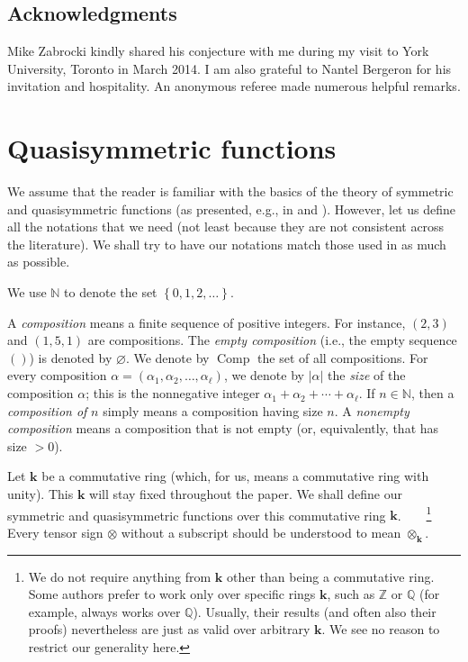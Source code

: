 \documentclass
[numbers=enddot,12pt,final,onecolumn,notitlepage,abstracton]{scrartcl}%
\theoremstyle{definition}
\begin{document}
\subsection{Acknowledgments}

Mike Zabrocki kindly shared his conjecture with me during my visit to York
University, Toronto in March 2014. I am also grateful to Nantel Bergeron for
his invitation and hospitality. An anonymous referee made numerous helpful remarks.

\section{\label{sect.qsym}Quasisymmetric functions}

We assume that the reader is familiar with the basics of the theory of
symmetric and quasisymmetric functions (as presented, e.g., in \cite[Chapters
4 and 6]{HGK} and \cite[Chapters 2 and 5]{Reiner}). However, let us define all
the notations that we need (not least because they are not consistent across
the literature). We shall try to have our notations match those used in
\cite[Section 2]{BBSSZ} as much as possible.

We use $\mathbb{N}$ to denote the set $\left\{  0,1,2,\ldots\right\}  $.

A \textit{composition} means a finite sequence of positive integers. For
instance, $\left(  2,3\right)  $ and $\left(  1,5,1\right)  $ are
compositions. The \textit{empty composition} (i.e., the empty sequence
$\left(  {}\right)  $) is denoted by $\varnothing$. We denote by
$\operatorname*{Comp}$ the set of all compositions. For every composition
$\alpha=\left(  \alpha_{1},\alpha_{2},\ldots,\alpha_{\ell}\right)  $, we
denote by $\left\vert \alpha\right\vert $ the \textit{size} of the composition
$\alpha$; this is the nonnegative integer $\alpha_{1}+\alpha_{2}+\cdots
+\alpha_{\ell}$. If $n\in\mathbb{N}$, then a \textit{composition of }$n$
simply means a composition having size $n$. A \textit{nonempty composition}
means a composition that is not empty (or, equivalently, that has size $>0$).

Let $\mathbf{k}$ be a commutative ring (which, for us, means a commutative
ring with unity). This $\mathbf{k}$ will stay fixed throughout the paper. We
shall define our symmetric and quasisymmetric functions over this commutative
ring $\mathbf{k}$.\ \ \ \ \footnote{We do not require anything from
$\mathbf{k}$ other than being a commutative ring. Some authors prefer to work
only over specific rings $\mathbf{k}$, such as $\mathbb{Z}$ or $\mathbb{Q}$
(for example, \cite{BBSSZ} always works over $\mathbb{Q}$). Usually, their
results (and often also their proofs) nevertheless are just as valid over
arbitrary $\mathbf{k}$. We see no reason to restrict our generality here.}
Every tensor sign $\otimes$ without a subscript should be understood to mean
$\otimes_{\mathbf{k}}$.
\end{document}
